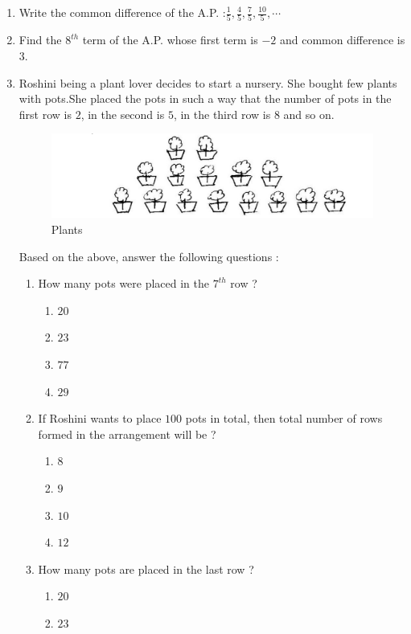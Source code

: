 \begin{enumerate}
	\item Write the common difference of the A.P. :$\frac{1}{5}, \frac{4}{5}, \frac{7}{5}, \frac{10}{5}, \cdots$

	\item Find the $8^{th}$ term of the A.P. whose first term is $-2$ and common difference is $3$.
	\item
	Roshini being a plant lover decides to start a nursery. She bought few plants with pots.She placed the pots in such a way that the number of pots in the first row is $2$, in the second is $5$, in the third row is $8$ and so on.
		\begin{figure}[h]
			\centering	
			\includegraphics[width=\columnwidth]{figs/Plant.png}
			\caption{Plants}
			\label{fig:Plants}
		\end{figure}
		Based on the above, answer the following questions :
		\begin{enumerate}[label=(\roman*)]
			\item How many pots were placed in the $7^{th}$ row ?
				\begin{enumerate}[label=\Alph*]
					\item $20$
					\item $23$
					\item $77$
					\item $29$
				\end{enumerate}
			\item If Roshini wants to place $100$ pots in total, then total number of rows formed in the arrangement will be ?
				\begin{enumerate}[label=\Alph*]
					\item $8$
					\item $9$
					\item $10$
					\item $12$
				\end{enumerate}
			\item How many pots are placed in the last row ?
				\begin{enumerate}[label=\Alph*]
					\item $20$
					\item $23$

\end{enumerate}
\end{enumerate}
\end{enumerate}
